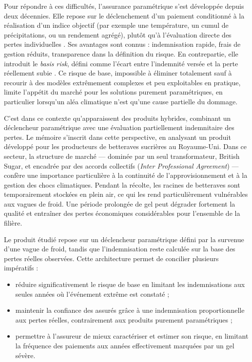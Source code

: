 \documentclass[11pt,a4paper,openright,twoside]{report}
\begin{document}
Pour répondre à ces difficultés, l’assurance paramétrique s’est développée depuis deux décennies. Elle repose sur le déclenchement d’un paiement conditionné à la réalisation d’un indice objectif (par exemple une température, un cumul de précipitations, ou un rendement agrégé), plutôt qu’à l’évaluation directe des pertes individuelles \citep{barnett2008agricultural}. Ses avantages sont connus : indemnisation rapide, frais de gestion réduits, transparence dans la définition du risque. En contrepartie, elle introduit le \textit{basis risk}, défini comme l’écart entre l’indemnité versée et la perte réellement subie \citep{bastos2021parametric}. Ce risque de base, impossible à éliminer totalement sauf à recourir à des modèles extrêmement complexes et peu exploitables en pratique, limite l’appétit du marché pour les solutions purement paramétriques, en particulier lorsqu’un aléa climatique n’est qu’une cause partielle du dommage.  

C’est dans ce contexte qu’apparaissent des produits hybrides, combinant un déclencheur paramétrique avec une évaluation partiellement indemnitaire des pertes. Le mémoire s’inscrit dans cette perspective, en analysant un produit développé pour les producteurs de betteraves sucrières au Royaume-Uni. Dans ce secteur, la structure de marché --- dominée par un seul transformateur, British Sugar, et encadrée par des accords collectifs (\textit{Inter Professional Agreement}) --- confère une importance particulière à la continuité de l’approvisionnement et à la gestion des chocs climatiques. Pendant la récolte, les racines de betteraves sont temporairement stockées en plein air, ce qui les rend particulièrement vulnérables aux vagues de froid. Une période prolongée de gel peut dégrader fortement la qualité et entraîner des pertes économiques considérables pour l’ensemble de la filière.  

Le produit étudié repose sur un déclencheur paramétrique défini par la survenue d’une vague de froid, tandis que l’indemnisation reste calculée sur la base des pertes réelles observées. Cette architecture permet de concilier plusieurs impératifs :  
\begin{itemize}
    \item réduire significativement le risque de base en limitant les indemnisations aux seules années où l’événement extrême est constaté ;
    \item maintenir la confiance des assurés grâce à une indemnisation proportionnelle aux pertes réelles, contrairement aux produits purement paramétriques ;
    \item permettre à l’assureur de mieux caractériser et estimer son risque, en limitant la fréquence des paiements aux années effectivement marquées par un gel sévère.
\end{itemize}
\end{document}
